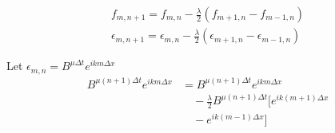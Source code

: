 \documentclass[fleqn,10pt]{SelfArx} %
\begin{document}
\begin{align*}
	f_{m,n+1} = f_{m,n} -\frac{\lambda}{2}\left(f_{m+1,n} - f_{m-1,n}\right) \\
	\epsilon_{m,n+1} = \epsilon_{m,n} -\frac{\lambda}{2}\left(\epsilon_{m+1,n} - \epsilon_{m-1,n}\right)
\end{align*}

Let \( \epsilon_{m,n} = B^{\mu \Delta t} e^{ikm\Delta x}\)
\begin{align*}
	B^{\mu (n+1) \Delta t} e^{ikm\Delta x} &= B^{\mu (n+1) \Delta t} e^{ikm\Delta x} \\ &\quad -\frac{\lambda}{2} B^{\mu (n+1) \Delta t}\big[e^{ik(m+1)\Delta x} \\ &\quad -e^{ik(m-1)\Delta x} \big]
\end{align*}



\clearpage



\end{document}
